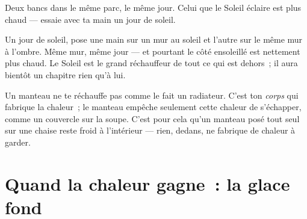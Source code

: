\begin{omfigure}

{\small Deux bancs dans le même parc, le même jour. Celui que le
Soleil éclaire est plus chaud --- essaie avec ta main un jour de
soleil.}
\end{omfigure}

\begin{example}\label{ex:g1:hot-and-cold:sunshade}
Un jour de soleil, pose une main sur un mur au soleil et l'autre sur
le même mur à l'ombre. Même mur, même jour --- et pourtant le côté
ensoleillé est nettement plus chaud. Le Soleil est le grand
réchauffeur de tout ce qui est dehors~; il aura bientôt un chapitre
rien qu'à lui.
\end{example}

\begin{remark}\label{rem:g1:hot-and-cold:coat}
Un manteau ne te réchauffe pas comme le fait un radiateur. C'est ton
\emph{corps} qui fabrique la chaleur~; le manteau empêche seulement
cette chaleur de s'échapper, comme un couvercle sur la soupe. C'est
pour cela qu'un manteau posé tout seul sur une chaise reste froid à
l'intérieur --- rien, dedans, ne fabrique de chaleur à garder.
\end{remark}

\section{Quand la chaleur gagne~: la glace fond}

